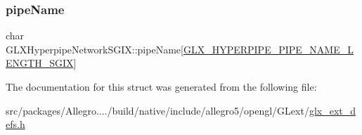 \subsubsection{\texorpdfstring{pipe\+Name}{pipeName}}
{\footnotesize\ttfamily char G\+L\+X\+Hyperpipe\+Network\+S\+G\+I\+X\+::pipe\+Name\mbox{[}\hyperlink{glx__ext__defs_8h_ae1c8261c0861010d8003a31d07e26005}{G\+L\+X\+\_\+\+H\+Y\+P\+E\+R\+P\+I\+P\+E\+\_\+\+P\+I\+P\+E\+\_\+\+N\+A\+M\+E\+\_\+\+L\+E\+N\+G\+T\+H\+\_\+\+S\+G\+IX}\mbox{]}}



The documentation for this struct was generated from the following file\+:\begin{DoxyCompactItemize}
\item 
src/packages/\+Allegro..../build/native/include/allegro5/opengl/\+G\+Lext/\hyperlink{glx__ext__defs_8h}{glx\+\_\+ext\+\_\+defs.\+h}\end{DoxyCompactItemize}
